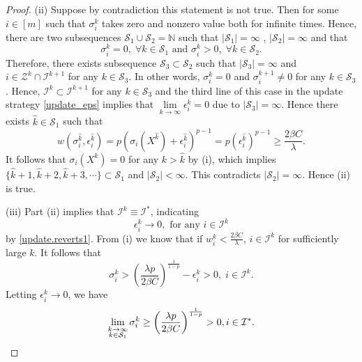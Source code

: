 \documentclass[twoside,11pt]{article}
\newcommand{\Ical}{\mathcal{I}}
\newcommand{\Zcal}{\mathcal{Z}}
\numberwithin{equation}{section}
\begin{document}
\begin{proof}
(ii)       Suppose by contradiction this statement is not true. 
      Then for some $i\in[m] $ such that $\sigma_i^k $ takes zero and nonzero value both for infinite times. Hence, there are two subsequences $\mathcal{S}_{1}\cup\mathcal{S}_{2}=\mathbb{N} $ such that $|\mathcal{S}_{1}|=\infty $ , $|\mathcal{S}_{2}|=\infty $ and that 
      \begin{equation*}
        \sigma_i^k = 0 ,\; \forall k\in\mathcal{S}_{1} \text{ and } 
        \sigma_i^k > 0 ,\; \forall k\in\mathcal{S}_{2}.
      \end{equation*}
      Therefore, there exists subsequence $\mathcal{S}_3 \subset\mathcal{S}_2$ such that $|\mathcal{S}_3|=\infty$ and  
       $ i\in\Zcal^k\cap\Ical^{k+1}$ for any $k\in \mathcal{S}_3$. In other words, $\sigma_i^k=0$ and $\sigma_i^{k+1}\ne 0$ for any 
       $k\in\mathcal{S}_3$.  Hence, $\Ical^k \subset\Ical^{k+1}$  for any 
       $k\in\mathcal{S}_3$ and the third line of this case in the update strategy \ref{update_eps} 
      implies that $\lim\limits_{k\to\infty}\epsilon_{i}^{k}=0 $ due to $|\mathcal{S}_{3}|=\infty .$  
      Hence there exists $\hat{k}\in\mathcal{S}_1$ such that 
      \begin{equation*}
        w (\sigma_i^{\hat{k}} ,\epsilon_i^{\hat{k}}) = p \left(\sigma_i (X^{\hat{k}})+\epsilon_i^{\hat{k}} \right)^{p-1} = p (\epsilon_i^{\hat{k}})^{p-1} \ge \frac{2\beta C}{\lambda}. 
      \end{equation*}
      It follows that $\sigma_i (X^{k})=0 $ for any $k>\hat{k}$ by   (i), which implies $\{\hat{k}+1,\hat{k}+2,\hat{k}+3,\cdots\}\subset\mathcal{S}_{1} $ and $|\mathcal{S}_{2}|<\infty $. This contradicts  $|\mathcal{S}_{2}|=\infty $. Hence  (ii) is true.   

(iii)      Part (ii) implies that $\Ical^k \equiv \Ical^*$, indicating  
       \begin{equation}\label{eps.to.0} 
       \epsilon_i^k \to 0, \text{ for any } i \in \Ical^k
       \end{equation} 
        by   \eqref{update.reverts1}. 
       From  (i) we know that if    $w_{i}^{k}<\frac{2\beta C}{\lambda}$, $i\in\Ical^k$  for sufficiently large $k$. 
      It follows that  
      \begin{equation*}
      \sigma_i^k> \left(\frac{\lambda p}{2\beta C}\right)^{\frac{1}{1-p}}-\epsilon_{i}^{k} > 0,\; i\in\mathcal{I}^k.
      \end{equation*}  
     Letting $\epsilon_i^k \to 0$,   we have 
      \begin{equation*}
          \lim\limits_{\begin{subarray}{c} k\to\infty \\ k\in\mathcal{S}_{1}\end{subarray}} 
          \sigma_i^k \ge  \left(\frac{\lambda p}{2\beta C}\right)^{\frac{1}{1-p}} >0, i\in\mathcal{I}^{*}. 
      \end{equation*}
  
   
\end{proof} 
\end{document}
